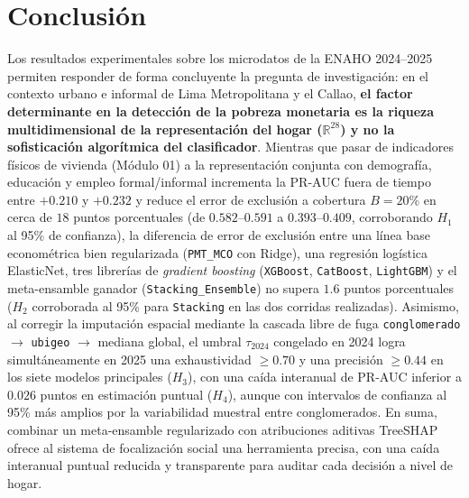 \section{Conclusión}

Los resultados experimentales sobre los microdatos de la ENAHO 2024--2025 permiten responder de forma concluyente la pregunta de investigación: en el contexto urbano e informal de Lima Metropolitana y el Callao, \textbf{el factor determinante en la detección de la pobreza monetaria es la riqueza multidimensional de la representación del hogar ($\mathbb{R}^{28}$) y no la sofisticación algorítmica del clasificador}. Mientras que pasar de indicadores físicos de vivienda (Módulo 01) a la representación conjunta con demografía, educación y empleo formal/informal incrementa la PR-AUC fuera de tiempo entre $+0.210$ y $+0.232$ y reduce el error de exclusión a cobertura $B=20\%$ en cerca de $18$ puntos porcentuales (de $0.582\text{--}0.591$ a $0.393\text{--}0.409$, corroborando $H_1$ al 95\% de confianza), la diferencia de error de exclusión entre una línea base econométrica bien regularizada (\texttt{PMT\_MCO} con Ridge), una regresión logística ElasticNet, tres librerías de \textit{gradient boosting} (\texttt{XGBoost}, \texttt{CatBoost}, \texttt{LightGBM}) y el meta-ensamble ganador (\texttt{Stacking\_Ensemble}) no supera $1.6$ puntos porcentuales ($H_2$ corroborada al 95\% para \texttt{Stacking} en las dos corridas realizadas). Asimismo, al corregir la imputación espacial mediante la cascada libre de fuga \texttt{conglomerado} $\rightarrow$ \texttt{ubigeo} $\rightarrow$ mediana global, el umbral $\tau_{2024}$ congelado en 2024 logra simultáneamente en 2025 una exhaustividad $\ge 0.70$ y una precisión $\ge 0.44$ en los siete modelos principales ($H_3$), con una caída interanual de PR-AUC inferior a $0.026$ puntos en estimación puntual ($H_4$), aunque con intervalos de confianza al 95\% más amplios por la variabilidad muestral entre conglomerados. En suma, combinar un meta-ensamble regularizado con atribuciones aditivas TreeSHAP ofrece al sistema de focalización social una herramienta precisa, con una caída interanual puntual reducida y transparente para auditar cada decisión a nivel de hogar.
